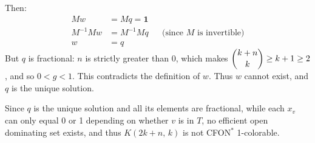 \documentclass[11pt]{article}
\begin{document}
Then:
\begin{align*}
  Mw &= Mq = \mathbf{1} \\
  M^{-1}Mw &= M^{-1}Mq && \text{(since $M$ is invertible)} \\
  w &= q
\end{align*}
But $q$ is fractional: $n$ is strictly greater than 0, which makes
$\dbinom{k+n}{k} \ge k+1 \ge 2$, and so $0 < g < 1$. This contradicts the
definition of $w$. Thus $w$ cannot exist, and $q$ is the unique solution.

Since $q$ is the unique solution and all its elements are fractional, while
each $x_v$ can only equal 0 or 1 depending on whether $v$ is in $T$, no
efficient open dominating set exists, and thus $K(2k+n,\,k)$ is not
CFON$^{*}$ 1-colorable.
\end{document}
